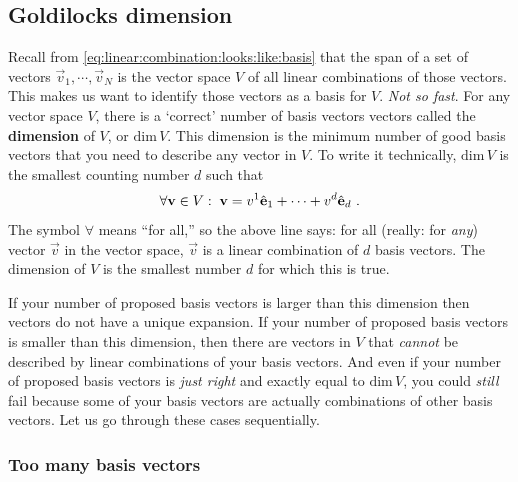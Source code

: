 \subsection{Goldilocks dimension} %

Recall from \eqref{eq:linear:combination:looks:like:basis} that the span of a set of vectors $\vec{v}_1, \cdots, \vec{v}_N$ is the vector space $V$ of all linear combinations of those vectors. This makes us want to identify those vectors as a basis for $V$. \emph{Not so fast}. For any vector space $V$, there is a `correct' number of basis vectors vectors called the \textbf{dimension} of $V$, or $\text{dim}\,V$. This dimension is the minimum number of good basis vectors that you need to describe any vector in $V$. To write it technically, $\text{dim}\,V$ is the smallest counting number $d$ such that
\begin{align}
    \forall \mathbf{v} \in V :\; \mathbf{v} = v^1 \hat{\mathbf{e}}_1 + \cdots + v^{d}\hat{\mathbf{e}}_{d} \ .
\end{align}
The symbol $\forall$ means ``for all,'' so the above line says: for all (really: for \emph{any}) vector $\vec{v}$ in the vector space, $\vec{v}$ is a linear combination of $d$ basis vectors. The dimension of $V$ is the smallest number $d$ for which this is true. 

If your number of proposed basis vectors is larger than this dimension then vectors do not have a unique expansion. If your number of proposed basis vectors is smaller than this dimension, then there are vectors in $V$ that \emph{cannot} be described by linear combinations of your basis vectors. And even if your number of proposed basis vectors is \emph{just right} and exactly equal to $\text{dim}\,V$, you could \emph{still} fail because some of your basis vectors are actually combinations of other basis vectors. Let us go through these cases sequentially.

\subsubsection{Too many basis vectors}

